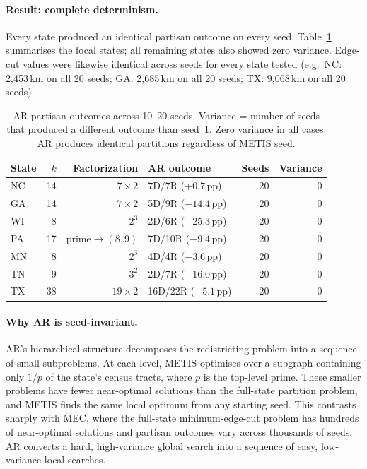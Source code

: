 \paragraph{Result: complete determinism.}
Every state produced an identical partisan outcome on every seed.
Table~\ref{tab:seed-sensitivity} summarises the focal states; all remaining
states also showed zero variance. Edge-cut values were likewise identical
across seeds for every state tested (e.g.\ NC: 2{,}453\,km on all 20 seeds;
GA: 2{,}685\,km on all 20 seeds; TX: 9{,}068\,km on all 20 seeds).

\begin{table}[h]
\centering\small
\begin{tabular}{lrrlrr}
\toprule
State & $k$ & Factorization & AR outcome & Seeds & Variance \\
\midrule
NC & 14 & $7 \times 2$ & 7D/7R ($+0.7$\,pp) & 20 & 0 \\
GA & 14 & $7 \times 2$ & 5D/9R ($-14.4$\,pp) & 20 & 0 \\
WI & 8  & $2^3$        & 2D/6R ($-25.3$\,pp) & 20 & 0 \\
PA & 17 & prime$\to(8{,}9)$ & 7D/10R ($-9.4$\,pp) & 20 & 0 \\
MN & 8  & $2^3$        & 4D/4R ($-3.6$\,pp)  & 20 & 0 \\
TN & 9  & $3^2$        & 2D/7R ($-16.0$\,pp) & 20 & 0 \\
TX & 38 & $19 \times 2$ & 16D/22R ($-5.1$\,pp) & 20 & 0 \\
\bottomrule
\end{tabular}
\caption{AR partisan outcomes across 10--20 seeds. Variance = number of seeds
  that produced a different outcome than seed~1. Zero variance in all cases:
  AR produces identical partitions regardless of METIS seed.}
\label{tab:seed-sensitivity}
\end{table}

\paragraph{Why AR is seed-invariant.}
AR's hierarchical structure decomposes the redistricting problem into a
sequence of small subproblems. At each level, METIS optimises over a
subgraph containing only $1/p$ of the state's census tracts, where $p$ is the
top-level prime. These smaller problems have fewer near-optimal solutions than
the full-state partition problem, and METIS finds the same local optimum from
any starting seed. This contrasts sharply with MEC, where the full-state
minimum-edge-cut problem has hundreds of near-optimal solutions and partisan
outcomes vary across thousands of seeds. AR converts a hard, high-variance
global search into a sequence of easy, low-variance local searches.

